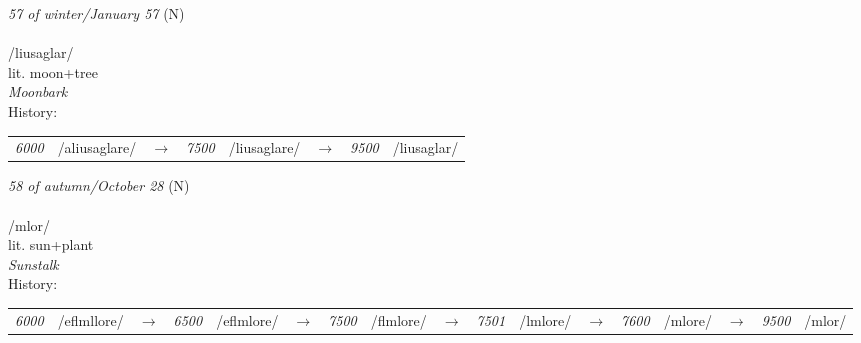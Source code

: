 \vspace{15pt}
\begin{nopagebreak}
 \textit{57 of winter/January 57} (N)\\
\\
\noindent /lius{\textprimstress}aglar/\\
\noindent lit. moon+tree\\
\noindent \textit{Moonbark}\\


\noindent History:

\vspace{-0pt}
\hspace{40pt}
\begin{tabular}{ccc}
\textit{6000} & /aliusaglare/&$\rightarrow$ & \textit{7500} & /liusaglare/&$\rightarrow$ & \textit{9500} & /liusaglar/& \\
\end{tabular}

\vspace{20pt}\hline

\end{nopagebreak}
\filbreak



\vspace{15pt}
\begin{nopagebreak}
 \textit{58 of autumn/October 28} (N)\\
\\
\noindent /ml{\textprimstress}or/\\
\noindent lit. sun+plant\\
\noindent \textit{Sunstalk}\\


\noindent History:

\vspace{-0pt}
\hspace{40pt}
\begin{tabular}{ccc}
\textit{6000} & /eflmllore/&$\rightarrow$ & \textit{6500} & /eflmlore/&$\rightarrow$ & \textit{7500} & /flmlore/&$\rightarrow$ & \textit{7501} & /lmlore/&$\rightarrow$ & \textit{7600} & /mlore/&$\rightarrow$ & \textit{9500} & /mlor/& \\
\end{tabular}

\vspace{20pt}\hline

\end{nopagebreak}
\filbreak



